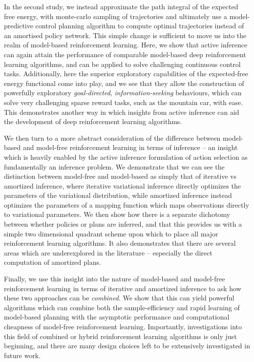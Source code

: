 In the second study, we instead approximate the path integral of the expected free energy, with monte-carlo sampling of trajectories and ultimately use a model-predictive control planning algorithm to compute optimal trajectories instead of an amortised policy network. This simple change is sufficient to move us into the realm of model-based reinforcement learning. Here, we show that active inference can again attain the performance of comparable model-based deep reinforcement learning algorithms, and can be applied to solve challenging continuous control tasks. Additionally, here the superior exploratory capabilities of the expected-free energy functional come into play, and we see that they allow the construction of powerfully exploratory \emph{goal-directed}, \emph{information-seeking} behaviours, which can solve very challenging sparse reward tasks, such as the mountain car, with ease. This demonstrates another way in which insights from active inference can aid the development of deep reinforcement learning algorithms.

We then turn to a more abstract consideration of the difference between model-based and model-free reinforcement learning in terms of inference -- an insight which is heavily enabled by the active inference formulation of action selection as fundamentally an inference problem. We demonstrate that we can see the distinction between model-free and model-based as simply that of iterative vs amortized inference, where iterative variational inference directly optimizes the parameters of the variational distribution, while amortized inference instead optimizes the parameters of a mapping function which maps observations directly to variational parameters. We then show how there is a separate dichotomy between whether policies or plans are inferred, and that this provides us with a simple two dimensional quadrant scheme upon which to place all major reinforcement learning algorithms. It also demonstrates that there are several areas which are underexplored in the literature -- especially the direct computation of amortized plans.

Finally, we use this insight into the nature of model-based and model-free reinforcement learning in terms of iterative and amortized inference to ask how these two approaches can be \emph{combined}. We show that this can yield powerful algorithms which can combine both the sample-efficiency and rapid learning of model-based planning with the asymptotic performance and computational cheapness of model-free reinforcement learning. Importantly, investigations into this field of combined or hybrid reinforcement learning algorithms is only just beginning, and there are many design choices left to be extensively investigated in future work.

